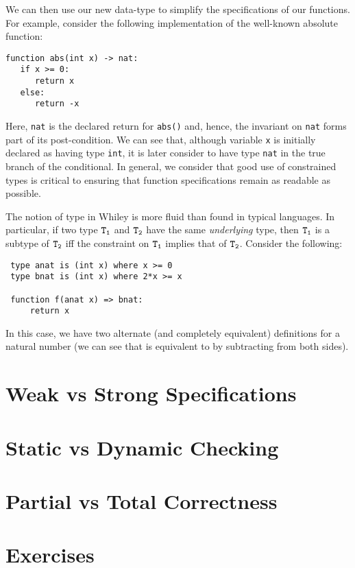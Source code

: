 We can then use our new data-type to simplify the specifications of our functions.  For example, consider the following implementation of the well-known absolute function:

\begin{lstlisting}
function abs(int x) -> nat:
   if x >= 0:
      return x
   else:
      return -x
\end{lstlisting}

Here, \lstinline{nat} is the declared return for \lstinline{abs()} and, hence, the invariant on \lstinline{nat} forms part of its post-condition.  We can see that, although variable \lstinline{x} is initially declared as having type \lstinline{int}, it is later consider to have type \lstinline{nat} in the true branch of the conditional.  In general, we consider that good use of constrained types is critical to ensuring that function specifications remain as readable as possible.

The notion of type in Whiley is more fluid than found in typical languages.  In particular, if two type ${\tt T_1}$ and ${\tt T_2}$ have the same {\em underlying} type, then ${\tt T_1}$ is a subtype of ${\tt T_2}$ iff the constraint on ${\tt T_1}$ implies that of ${\tt T_2}$.  Consider the following:

\begin{lstlisting}
 type anat is (int x) where x >= 0
 type bnat is (int x) where 2*x >= x

 function f(anat x) => bnat:
     return x
\end{lstlisting}

In this case, we have two alternate (and completely equivalent) definitions for a natural number (we can see that  is equivalent to  by subtracting  from both sides). 

\section{Weak vs Strong Specifications}
\section{Static vs Dynamic Checking}
\section{Partial vs Total Correctness}

\section{Exercises}

